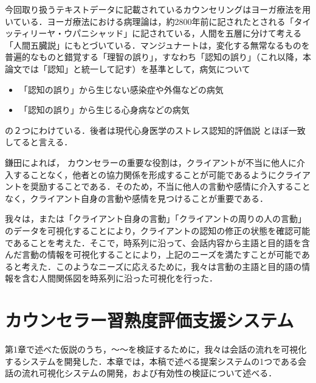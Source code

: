 \documentclass[shuuron]{kuee}
\begin{document}
今回取り扱うテキストデータに記載されているカウンセリングはヨーガ療法を用いている．ヨーガ療法における病理論は，約2800年前に記されたとされる「タイッティリーヤ・ウパニシャッド」に記されている，人間を五層に分けて考える「人間五臓説」にもとづいている\cite{kimura}．マンジュナート\cite{manjunath}は，変化する無常なるものを普遍的なものと錯覚する「理智の誤り」，すなわち「認知の誤り」（これ以降，本論文では「認知」と統一して記す）を基準として，病気について
\begin{itemize}
\item 「認知の誤り」から生じない感染症や外傷などの病気
\item 「認知の誤り」から生じる心身病などの病気
\end{itemize}
の２つにわけている．後者は現代心身医学のストレス認知的評価説
\cite{Lazarus}とほぼ一致してると言える\cite{Darshana}．


 鎌田\cite{kamata2002}によれば， カウンセラーの重要な役割は，クライアントが不当に他人に介入することなく，他者との協力関係を形成することが可能であるようにクライアントを奨励することである．そのため，不当に他人の言動や感情に介入することなく，クライアント自身の言動や感情を見つけることが重要である．


 我々は，または「クライアント自身の言動」「クライアントの周りの人の言動」のデータを可視化することにより，クライアントの認知の修正の状態を確認可能であることを考えた．そこで，時系列に沿って、会話内容から主語と目的語を含んだ言動の情報を可視化することにより，上記のニーズを満たすことが可能であると考えた．このようなニーズに応えるために，我々は言動の主語と目的語の情報を含む人間関係図を時系列に沿った可視化を行った．



\chapter{カウンセラー習熟度評価支援システム}





第1章で述べた仮説のうち，〜〜を検証するために，我々は会話の流れを可視化するシステムを開発した．本章では，本稿で述べる提案システムの1つである会話の流れ可視化システムの開発，および有効性の検証について述べる．
\end{document}
